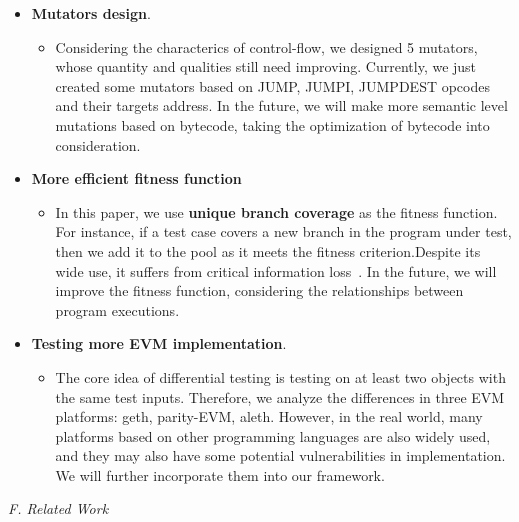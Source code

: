 \documentclass[a4paper]{article}
\begin{document}
	\begin{itemize}
		\item \textbf{Mutators design}. 
		\begin{itemize}
			\item Considering the characterics of control-flow, we designed 5 mutators,
			whose quantity and qualities still need improving. Currently, we just created some mutators based on JUMP, JUMPI, JUMPDEST opcodes and their targets address. In the future, we
			will make more semantic level mutations based on bytecode, taking the optimization of bytecode into consideration.
		\end{itemize}
		\item \textbf{More efficient fitness function}
		\begin{itemize}
			\item In this paper, we use
			\textbf{unique branch coverage} as the fitness function. For instance, if a test case
			covers a new branch in the program under test, then we add it to
			the pool as it meets the fitness criterion.Despite its wide use, it suffers from critical information loss~. In the future, we will improve the fitness function, considering the relationships between program executions.
		\end{itemize}
		
		\item \textbf{Testing more EVM  implementation}. 
		\begin{itemize}
			\item The core idea of
			differential testing is testing on at least two objects with the
			same test inputs. Therefore, we analyze the differences in three
			EVM platforms: geth, parity-EVM, aleth. However, in
			the real world, many platforms based on other programming
			languages are also widely used, and they may also have some
			potential vulnerabilities in implementation. We will further incorporate them into our framework.
		\end{itemize}
	\end{itemize}
	\textit{F. Related Work}
\end{document}
